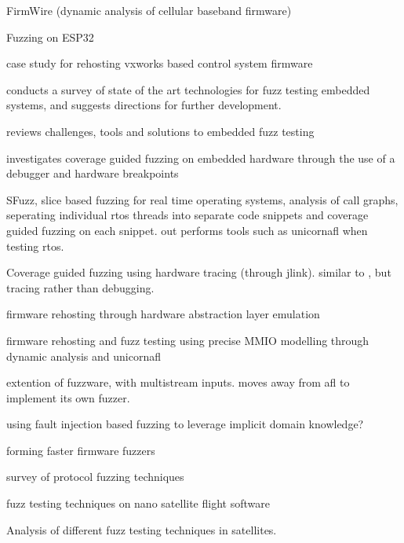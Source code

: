 \documentclass[../report.tex]{subfiles}
\begin{document}
\citet{Hernandez_2022} FirmWire (dynamic analysis of cellular baseband firmware)

\citet{Borsig_2020} Fuzzing on ESP32

\citet{Clements_2021} case study for rehosting vxworks based control system firmware

\citet{Yun_2022} conducts a survey of state of the art technologies for fuzz testing embedded systems, and suggests directions for further development.

\citet{Eisele_et_al_2022} reviews challenges, tools and solutions to embedded fuzz testing

\citet{Eisele_2022} investigates coverage guided fuzzing on embedded hardware through the use of a debugger and hardware breakpoints

\citet{Chen_2022} SFuzz, slice based fuzzing for real time operating systems, analysis of call graphs, seperating individual rtos threads into separate code snippets and coverage guided fuzzing on each snippet. out performs tools such as unicornafl when testing rtos.

\citet{Beckmann_2023} Coverage guided fuzzing using hardware tracing (through jlink). similar to \citet{Eisele_2022}, but tracing rather than debugging.

\citet{HALucinator_2020} firmware rehosting through hardware abstraction layer emulation

\citet{Fuzzware_2022} firmware rehosting and fuzz testing using precise MMIO modelling through dynamic analysis and unicornafl

\citet{Hoedur_2023} extention of fuzzware, with multistream inputs. moves away from afl to implement its own fuzzer.

\citet{Fuzztruction_2023} using fault injection based fuzzing to leverage implicit domain knowledge?

\citet{Seidel_2023} forming faster firmware fuzzers

\citet{Zhang_2024} survey of protocol fuzzing techniques

\citet{Gutierrez_2021} fuzz testing techniques on nano satellite flight software

\citet{Willbold_2024} Analysis of different fuzz testing techniques in satellites.

\end{document}

